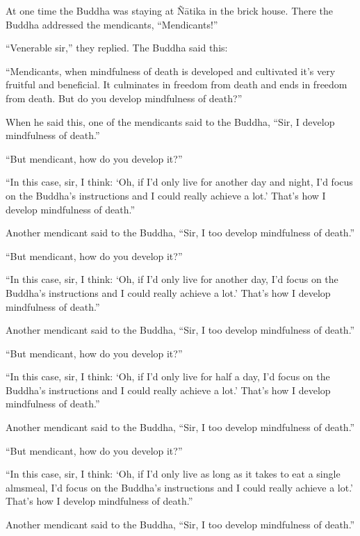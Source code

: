 \documentclass[12pt,openany]{book}%
\begin{document}
At one time the Buddha was staying at \textsanskrit{Ñātika} in the brick house. There the Buddha addressed the mendicants, “Mendicants!” 

“Venerable sir,” they replied. The Buddha said this: 

“Mendicants, when mindfulness of death is developed and cultivated it’s very fruitful and beneficial. It culminates in freedom from death and ends in freedom from death. But do you develop mindfulness of death?” 

When he said this, one of the mendicants said to the Buddha, “Sir, I develop mindfulness of death.” 

“But mendicant, how do you develop it?” 

“In this case, sir, I think: ‘Oh, if I’d only live for another day and night, I’d focus on the Buddha’s instructions and I could really achieve a lot.’ That’s how I develop mindfulness of death.” 

Another mendicant said to the Buddha, “Sir, I too develop mindfulness of death.” 

“But mendicant, how do you develop it?” 

“In this case, sir, I think: ‘Oh, if I’d only live for another day, I’d focus on the Buddha’s instructions and I could really achieve a lot.’ That’s how I develop mindfulness of death.” 

Another mendicant said to the Buddha, “Sir, I too develop mindfulness of death.” 

“But mendicant, how do you develop it?” 

“In this case, sir, I think: ‘Oh, if I’d only live for half a day, I’d focus on the Buddha’s instructions and I could really achieve a lot.’ That’s how I develop mindfulness of death.” 

Another mendicant said to the Buddha, “Sir, I too develop mindfulness of death.” 

“But mendicant, how do you develop it?” 

“In this case, sir, I think: ‘Oh, if I’d only live as long as it takes to eat a single almsmeal, I’d focus on the Buddha’s instructions and I could really achieve a lot.’ That’s how I develop mindfulness of death.” 

Another mendicant said to the Buddha, “Sir, I too develop mindfulness of death.” 
\end{document}
